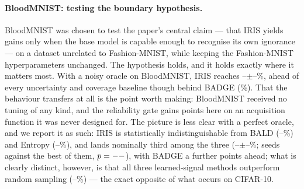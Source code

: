 \documentclass[a4paper,fleqn,longmktitle]{cas-sc}
\newcommand{\method}{IRIS}
\providecommand{\BloodCleanIrisFinal}{--}\providecommand{\BloodCleanIrisFinalStd}{--}
\providecommand{\BloodNoisyIrisFinal}{--}\providecommand{\BloodNoisyIrisFinalStd}{--}
\providecommand{\BloodCleanRandomFinal}{--}\providecommand{\BloodCleanRandomAubc}{--}
\providecommand{\BloodCleanEntropyFinal}{--}\providecommand{\BloodNoisyEntropyFinal}{--}
\providecommand{\BloodCleanBaldFinal}{--}\providecommand{\BloodNoisyBaldFinal}{--}
\begin{document}
\paragraph{BloodMNIST: testing the boundary hypothesis.} BloodMNIST
was chosen to test the paper's central claim --- that \method{} yields
gains only when the base model is capable enough to recognise its own
ignorance --- on a dataset unrelated to Fashion-MNIST, while keeping
the Fashion-MNIST hyperparameters unchanged. The hypothesis holds, and
it holds exactly where it matters most. With a noisy oracle on
BloodMNIST, \method{} reaches
\BloodNoisyIrisFinal$\pm$\BloodNoisyIrisFinalStd\%, ahead of every
uncertainty and coverage baseline though behind BADGE
(\BloodNoisyBadgeFinal\%). That the behaviour transfers at all is the
point worth making: BloodMNIST received no tuning of any kind, and the
reliability gate gains \BloodRelOnBadgeGain{} points here on an
acquisition function it was never designed for. The
picture is less clear with a perfect oracle, and we report it as such:
\method{} is statistically indistinguishable from BALD
(\BloodCleanBaldFinal\%) and Entropy (\BloodCleanEntropyFinal\%), and
lands nominally third among the three
(\BloodCleanIrisFinal$\pm$\BloodCleanIrisFinalStd\%;
\BloodCleanIrisClassicSeedsWon{} seeds against the best of them,
$p=--$), with BADGE a further
\BloodCleanBadgeOverIrisFinal{} points ahead; what is clearly distinct,
however, is that all three learned-signal methods outperform random
sampling
(\BloodCleanRandomFinal\%) --- the exact opposite of what occurs on
CIFAR-10.
\end{document}
